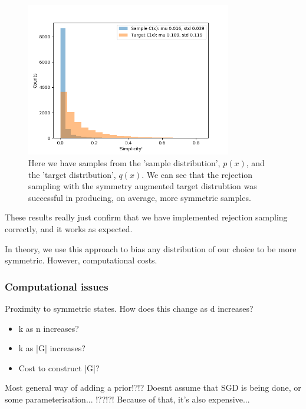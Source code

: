 \begin{figure}[h!]
  \centering
  \includegraphics[width=0.8\textwidth,height=0.4\textheight]{../../pictures/figures/s2-prior-rejection-8d.png}
  \caption{Here we have samples from the 'sample distribution', $p(x)$, and the 'target distribution', $q(x)$.
	We can see that the rejection sampling with the symmetry augmented target distrubtion was successful in producing, on average, more symmetric samples. }
\end{figure}


These results really just confirm that we have implemented
rejection sampling correctly, and it works as expected.


In theory, we use this approach to bias any distribution of our choice to be more symmetric.
However, computational costs.

\subsubsection{Computational issues}

Proximity to symmetric states. How does this change as d increases?

\begin{itemize}
	\tightlist
	\item k as n increases?
	\item k as |G| increases?
	\item Cost to construct |G|?
\end{itemize}

Most general way of adding a prior!?!?
Doesnt assume that SGD is being done, or some parameterisation... !??!?!
Because of that, it's also expensive...

